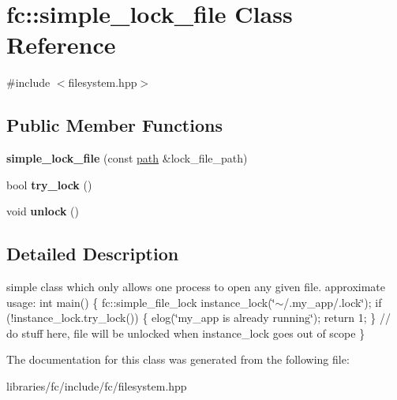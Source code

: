 \hypertarget{classfc_1_1simple__lock__file}{}\section{fc\+:\+:simple\+\_\+lock\+\_\+file Class Reference}
\label{classfc_1_1simple__lock__file}


{\ttfamily \#include $<$filesystem.\+hpp$>$}

\subsection*{Public Member Functions}
\begin{DoxyCompactItemize}
\item 
\mbox{\label{classfc_1_1simple__lock__file_ad909cb5e23a7b7dcf13678262913d995}} 
{\bfseries simple\+\_\+lock\+\_\+file} (const \mbox{\hyperlink{classfc_1_1path}{path}} \&lock\+\_\+file\+\_\+path)
\item 
\mbox{\label{classfc_1_1simple__lock__file_aefd985474fef8c05f6eb9b1577112cbe}} 
bool {\bfseries try\+\_\+lock} ()
\item 
\mbox{\label{classfc_1_1simple__lock__file_a0201df0839b69d4c37d61e0e74c1e767}} 
void {\bfseries unlock} ()
\end{DoxyCompactItemize}


\subsection{Detailed Description}
simple class which only allows one process to open any given file. approximate usage\+: int main() \{ fc\+::simple\+\_\+file\+\_\+lock instance\+\_\+lock(\char`\"{}$\sim$/.\+my\+\_\+app/.\+lock\char`\"{}); if (!instance\+\_\+lock.try\+\_\+lock()) \{ elog(\char`\"{}my\+\_\+app is already running\char`\"{}); return 1; \} // do stuff here, file will be unlocked when instance\+\_\+lock goes out of scope \} 

The documentation for this class was generated from the following file\+:\begin{DoxyCompactItemize}
\item 
libraries/fc/include/fc/filesystem.\+hpp\end{DoxyCompactItemize}
